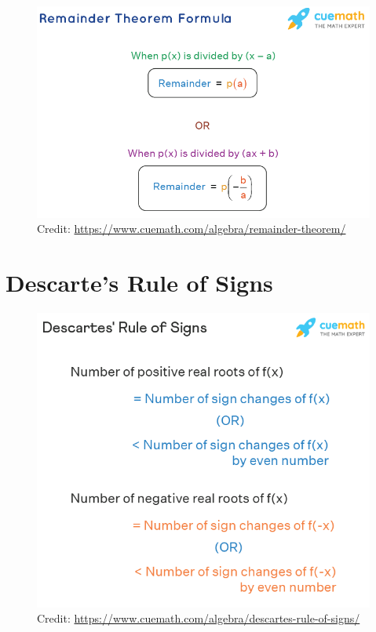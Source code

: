 \documentclass[12pt]{article}
\begin{document}
\begin{figure}[H]
	\centering
	\includegraphics[scale=0.6]{rt.png}
	\caption{Credit: \url{https://www.cuemath.com/algebra/remainder-theorem/}}
\end{figure}


\section{Descarte's Rule of Signs}

\begin{figure}[H]
	\centering
	\includegraphics[scale=0.6]{drs.png}
	\caption{Credit: \url{https://www.cuemath.com/algebra/descartes-rule-of-signs/}}
\end{figure}
\end{document}
